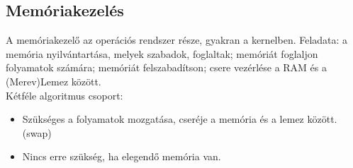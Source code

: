 \documentclass[margin=0px]{article}
\begin{document}
	\subsection{Memóriakezelés}
	
	A memóriakezelő az operációs rendszer része, gyakran a kernelben. Feladata: a memória nyilvántartása, melyek szabadok, foglaltak; memóriát foglaljon folyamatok számára; memóriát felszabadítson; csere vezérlése a RAM és a (Merev)Lemez között. \\
	Kétféle algoritmus csoport:
	\begin{itemize}
		\item Szükséges a folyamatok mozgatása, cseréje a memória és a lemez között. (swap)
		\item Nincs erre szükség, ha elegendő memória van.
	\end{itemize}
	
\end{document}
